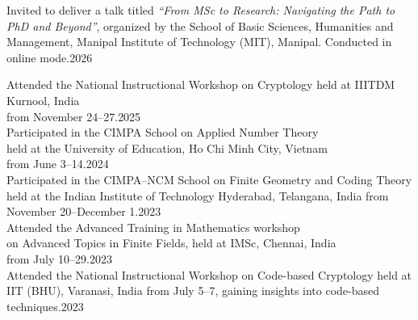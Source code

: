 \documentclass[
	a4paper,
	sidecolor=gray!50,
	sectioncolor=materialblue,
	subsectioncolor=materialindigo,
	profilepicsize=3.5cm,
	profilepicstyle=profilecircle,
	profilepiczoom=1.1,
]{sixtysecondscv}
\begin{document}
\makebacksidebar
\vspace{2mm}
\begin{cvtable}

{Invited to deliver a talk titled \textit{“From MSc to Research: Navigating the Path to PhD and Beyond”}, organized by the School of Basic Sciences, Humanities and Management, Manipal Institute of Technology (MIT), Manipal. Conducted in online mode.}{2026}

\end{cvtable}
\vspace{2mm}
\begin{cvtable}
{Attended the National Instructional Workshop on Cryptology held at IIITDM Kurnool, India \\from November 24--27.}{2025}\\


{Participated in the CIMPA School on Applied Number Theory\\
held at the University of Education, Ho Chi Minh City, Vietnam\\
from June 3--14.}{2024}\\

{Participated in the CIMPA–NCM School on Finite Geometry and Coding Theory\\
held at the Indian Institute of Technology Hyderabad, Telangana, India from November 20--December 1.}{2023}\\
       
{Attended the Advanced Training in Mathematics workshop\\
on Advanced Topics in Finite Fields, held at IMSc, Chennai, India\\
from July 10--29.}{2023}\\
        
{Attended the National Instructional Workshop on Code-based Cryptology held at IIT (BHU), Varanasi, India from July 5--7, gaining insights into code-based techniques.}{2023}\\


\end{cvtable}
\end{document}
